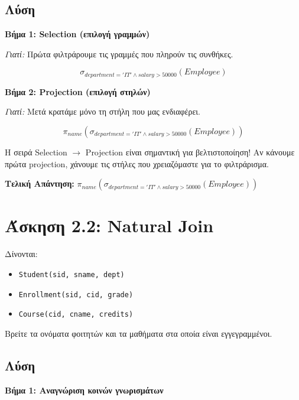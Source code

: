 \subsection*{Λύση}

\textbf{Βήμα 1: Selection (επιλογή γραμμών)}

\textit{Γιατί:} Πρώτα φιλτράρουμε τις γραμμές που πληρούν τις συνθήκες.

$$\sigma_{department='IT' \land salary > 50000}(Employee)$$

\textbf{Βήμα 2: Projection (επιλογή στηλών)}

\textit{Γιατί:} Μετά κρατάμε μόνο τη στήλη που μας ενδιαφέρει.

$$\pi_{name}(\sigma_{department='IT' \land salary > 50000}(Employee))$$

\begin{warningbox}
Η σειρά Selection $\to$ Projection είναι σημαντική για βελτιστοποίηση! Αν κάνουμε
πρώτα projection, χάνουμε τις στήλες που χρειαζόμαστε για το φιλτράρισμα.
\end{warningbox}

\textbf{Τελική Απάντηση:} $\pi_{name}(\sigma_{department='IT' \land salary > 50000}(Employee))$

\section{Άσκηση 2.2: Natural Join}

\begin{formulabox}[Εκφώνηση]
Δίνονται:
\begin{itemize}
    \item \texttt{Student(sid, sname, dept)}
    \item \texttt{Enrollment(sid, cid, grade)}
    \item \texttt{Course(cid, cname, credits)}
\end{itemize}

Βρείτε τα ονόματα φοιτητών και τα μαθήματα στα οποία είναι εγγεγραμμένοι.
\end{formulabox}

\subsection*{Λύση}

\textbf{Βήμα 1: Αναγνώριση κοινών γνωρισμάτων}

